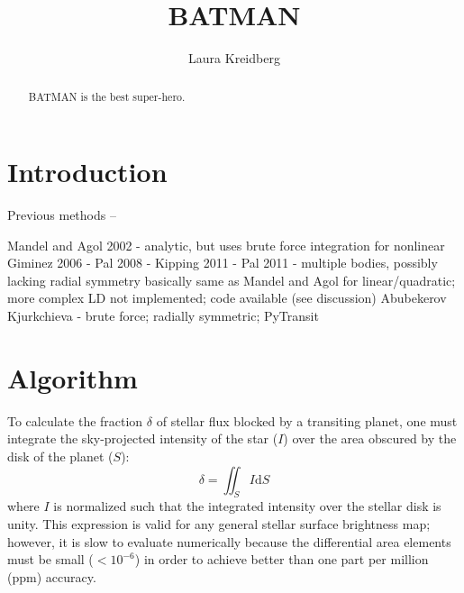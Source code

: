 \documentclass[12pt,preprint]{aastex}
\begin{document}
\title{BATMAN}

\author{Laura Kreidberg}



\begin{abstract}
BATMAN is the best super-hero.
\end{abstract}



\section{Introduction}
Previous methods --

Mandel and Agol 2002 - analytic, but uses brute force integration for nonlinear
Giminez 2006 -
Pal 2008 - 
Kipping 2011 -
Pal 2011 - multiple bodies, possibly lacking radial symmetry
	basically same as Mandel and Agol for linear/quadratic; more complex LD not implemented; code available (see discussion)
Abubekerov 
Kjurkchieva - brute force; radially symmetric; 
PyTransit

\section{Algorithm}
\label{section:algorithm}
To calculate the fraction $\delta$ of stellar flux blocked by a transiting planet, one must integrate the sky-projected intensity of the star ($I$) over the area obscured by the disk of the planet ($S$):
\begin{equation}
\delta = \iint_S{I \mathrm{d}S}
\label{eqn:surfaceint}
\end{equation}
where $I$ is normalized such that the integrated intensity over the stellar disk is unity. This expression is valid for any general stellar surface brightness map; however, it is slow to evaluate numerically because the differential area elements must be small ($<10^{-6}$) in order to achieve better than one part per million (ppm) accuracy.
\end{document}
